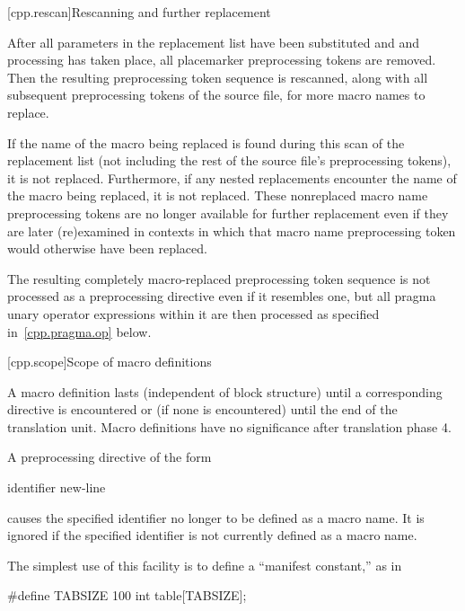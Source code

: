 [cpp.rescan]{Rescanning and further replacement}%
%

\pnum
After all parameters in the replacement list have been substituted and \tcode{\#} and \tcode{\#\#} processing has taken
place, all placemarker preprocessing tokens are removed. Then
the resulting preprocessing token sequence is rescanned, along with all
subsequent preprocessing tokens of the source file, for more macro names
to replace.

\pnum
If the name of the macro being replaced is found during this scan of
the replacement list
(not including the rest of the source file's preprocessing tokens),
it is not replaced.
Furthermore,
if any nested replacements encounter the name of the macro being replaced,
it is not replaced.
These nonreplaced macro name preprocessing tokens are no longer available
for further replacement even if they are later (re)examined in contexts
in which that macro name preprocessing token would otherwise have been
replaced.

\pnum
The resulting completely macro-replaced preprocessing token sequence
is not processed as a preprocessing directive even if it resembles one,
but all pragma unary operator expressions within it are then processed as
specified in~\ref{cpp.pragma.op} below.

[cpp.scope]{Scope of macro definitions}%
%

\pnum
A macro definition lasts
(independent of block structure)
until a corresponding
directive is encountered or
(if none is encountered)
until the end of the translation unit.
Macro definitions have no significance after translation phase 4.

\pnum
A preprocessing directive of the form

\begin{ncsimplebnf}
 identifier new-line
%
\end{ncsimplebnf}

causes the specified identifier no longer to be defined as a macro name.
It is ignored if the specified identifier is not currently defined as
a macro name.

\pnum
\enternote
The simplest use of this facility is to define a ``manifest constant,''
as in
\begin{codeblock}
#define TABSIZE 100
int table[TABSIZE];
\end{codeblock}
\exitnote

